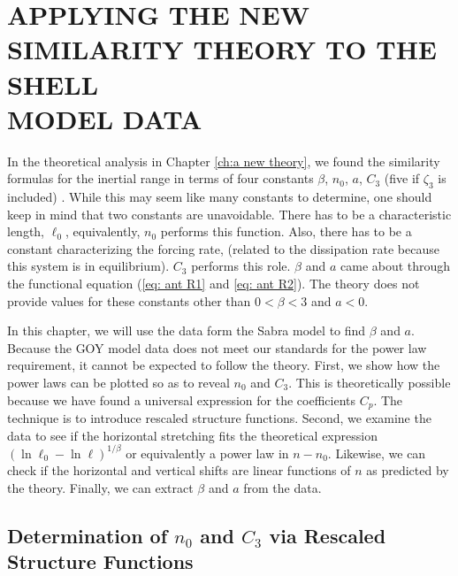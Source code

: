 
\chapter{APPLYING THE NEW SIMILARITY THEORY TO THE SHELL \\ MODEL DATA} \label{ch: before the theory}

In the theoretical analysis in Chapter \ref{ch:a new theory}, we found the similarity formulas for the inertial range in terms of four constants $\beta$, $n_0$, $a$, $C_3$ (five if $\zeta_3$ is included) .  While this may seem like many constants to determine, one should keep in mind that two constants are unavoidable.  There has to be a characteristic length, $\ell_0$, equivalently, $n_0$ performs this function.  Also, there has to be a constant characterizing the forcing rate, (related to the dissipation rate because this system is in equilibrium).  $C_3$ performs this role.  $\beta$ and $a$ came about through the functional equation (\ref{eq: ant R1} and \ref{eq: ant R2}).  The theory does not provide values for these constants other than $0<\beta<3$ and $a<0$.

In this chapter, we will use the data form the Sabra model to find $\beta$ and $a$.  Because the GOY model data does not meet our standards for the power law requirement, it cannot be expected to follow the theory. First, we show how the power laws can be plotted so as to reveal $n_0$ and $C_3$.  This is theoretically possible because we have found a universal expression for the coefficients $C_p$.  The technique is to introduce rescaled structure functions. Second, we examine the data to see if the horizontal stretching fits the theoretical expression $(\ln \ell_0 - \ln \ell)^{1/\beta}$ or equivalently a power law in $n - n_0$.  Likewise, we can check if the horizontal and vertical shifts are linear functions of $n$ as predicted by the theory.  Finally, we can extract $\beta$ and $a$ from the data.


\vspace{2in}

\section{Determination of $n_0$ and $C_3$ via Rescaled Structure Functions}

